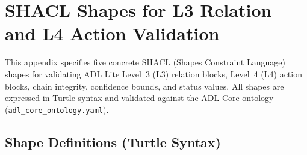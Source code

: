 \section{SHACL Shapes for L3 Relation and L4 Action Validation}\label{app:shacl}

This appendix specifies five concrete SHACL (Shapes Constraint Language) shapes for validating ADL Lite Level~3 (L3) relation blocks, Level~4 (L4) action blocks, chain integrity, confidence bounds, and status values. All shapes are expressed in Turtle syntax and validated against the ADL Core ontology (\texttt{adl\_core\_ontology.yaml}).

\subsection{Shape Definitions (Turtle Syntax)}

